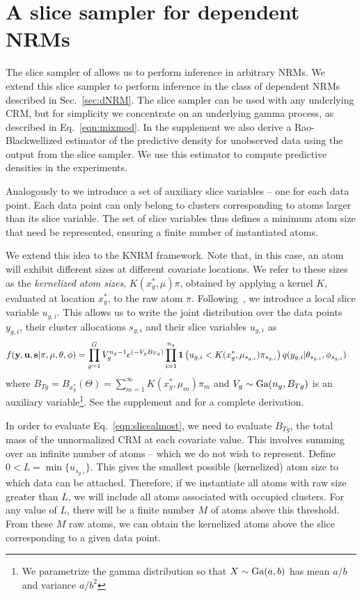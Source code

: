 \section{A slice sampler for dependent NRMs}

The slice sampler of \cite{GriffinWalker:2011} allows us to perform inference in arbitrary
NRMs. We extend this slice sampler to perform inference in the class of
dependent NRMs described in Sec.~\ref{sec:dNRM}.  The slice sampler can be used with any
underlying CRM, but for simplicity we concentrate on an underlying gamma
process, as described in Eq.~\ref{eqn:mixmod}.
In the supplement we also derive a Rao-Blackwellized estimator of
the predictive density for unobserved data using the output from the slice
sampler.  We use this estimator to compute predictive densities in the
experiments.

Analogously to \cite{GriffinWalker:2011} we introduce a set of auxiliary
slice variables -- one for each data point. Each data point can only belong to
clusters corresponding to atoms larger than its slice variable. The set of
slice variables thus defines a minimum atom size that need be represented,
ensuring a finite number of instantiated atoms.

We extend this idea to the KNRM framework. Note that, in this case, an atom
will exhibit different sizes at different covariate locations. We refer to
these sizes as the \emph{kernelized atom sizes}, $K(x_g^*,\mu)\pi$, obtained by
applying a kernel $K$, evaluated at location $x^*_g$, to the raw atom $\pi$.
Following~\cite{GriffinWalker:2011}, we introduce a local slice variable $u_{g,i}$. This allows
us to write the joint distribution over the data points $y_{g,i}$, their
cluster allocations $s_{g,i}$ and their slice variables $u_{g,i}$ as 
\begin{align}
  f({\mathbf y}, {\mathbf u}, {\mathbf s} | \pi, \mu, \theta, \phi) &=
  \prod_{g=1}^G V_g^{n_g-1} e^{(-V_g B_{Tg})} \prod_{i=1}^{n_g} \mathbf 1 \left (  u_{g,i}
  < K(x^*_g,\mu_{s_{g,i}})\pi_{s_{g,i}}  \right ) q(y_{g,i} | \theta_{s_{g,i}},
  \phi_{s_{g,i}})
  \label{eqn:slicealmost}
\end{align}
where $B_{Tg} = B_{x^*_g}(\Theta) = \sum_{m=1}^\infty K(x_g^*,\mu_m)\pi_m$ and $V_g \sim \text{Ga}(n_g,B_{Tg})$ 
is an auxiliary variable\footnote{We parametrize the gamma
distribution so that $X \sim \text{Ga}(a,b)$ has mean $a/b$ and variance
$a/b^2$}.  
See the supplement and \cite{GriffinWalker:2011,JamesLijoiPrunster:2009} for a 
complete derivation.

In order to evaluate Eq.~\ref{eqn:slicealmost}, we need to evaluate $B_{Tg}$,
the total mass of the unnormalized CRM at each covariate value. This involves
summing over an infinite number of atoms -- which we do not wish to represent.
Define $0 < L = \min{\{u_{s_{g,i}}\}}$. This gives the smallest possible
(kernelized) atom size to which data can be attached. Therefore, if we
instantiate all atoms with raw size greater than $L$, we will include all atoms
associated with occupied clusters. For any value of $L$, there will be a finite
number $M$ of atoms above this threshold. From these $M$ raw atoms, we can
obtain the kernelized atoms above the slice corresponding to a given data
point.

